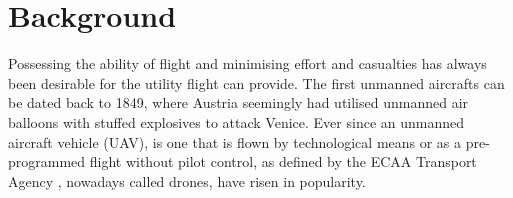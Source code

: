 \documentclass[titlepage,a4paper,11pt]{article}
\begin{document}

\section{Background}

Possessing the ability of flight and minimising effort and casualties has always been desirable for the utility flight can provide.
The first unmanned aircrafts can be dated back to 1849, where Austria seemingly had utilised unmanned air balloons with stuffed explosives to attack Venice. \cite{Vyas2020}
Ever since an unmanned aircraft vehicle (UAV), is one that is flown by technological means or as a pre-programmed flight without pilot control, as defined by the ECAA Transport Agency \cite{Droner}, nowadays called drones, have risen in popularity.
\end{document}
